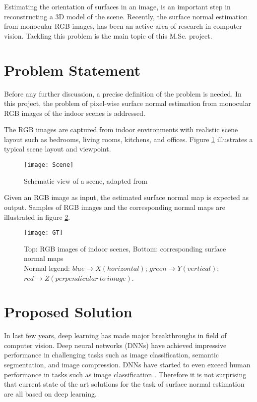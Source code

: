 Estimating the orientation of surfaces in an image, is an important step in reconstructing a 3D model of the scene. Recently, the surface normal estimation from monocular RGB images, has been an active area of research in computer vision. Tackling this problem is the main topic of this M.Sc. project. 

\pagebreak

\section{Problem Statement} \label{problemstatement}

Before any further discussion, a precise definition of the problem is needed. In this project, the problem of pixel-wise surface normal estimation from monocular RGB images of the indoor scenes is addressed. 

The RGB images are captured from indoor environments with realistic scene layout such as bedrooms, living rooms, kitchens, and offices. Figure \ref{fig:scene} illustrates a typical scene layout and viewpoint. 

\begin{figure}[h]
    \centering
    \texttt{[image: Scene]}
    \caption{Schematic view of a scene, adapted from \cite[p.~5]{sun}}
    \label{fig:scene}
\end{figure}

Given an RGB image as input, the estimated surface normal map is expected as output. Samples of RGB images and the corresponding normal maps are illustrated in figure \ref{fig:gt}. 

\begin{figure}[h]
    \centering
    \texttt{[image: GT]}
    \caption{Top: RGB images of indoor scenes, Bottom: corresponding surface normal maps \\
    Normal legend: {\color{blue} $blue\rightarrow X (horizontal)$}; {\color{green} $green\rightarrow Y (vertical)$}; {\color{red} $red\rightarrow Z (perpendicular\ to\ image)$}.}
    \label{fig:gt}
\end{figure}


\section{Proposed Solution}

In last few years, deep learning has made major breakthroughs in field of computer vision.  Deep neural networks (DNNs) have achieved impressive performance in challenging tasks such as image classification, semantic segmentation, and image compression. DNNs have started to even exceed human performance in tasks such as image classification \cite{humanvsdnn}. Therefore it is not surprising that current state of the art solutions for the task of surface normal estimation are all based on deep learning. 

